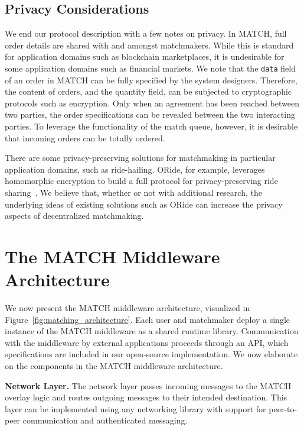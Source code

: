 \subsection{Privacy Considerations}
We end our protocol description with a few notes on privacy.
In MATCH, full order details are shared with and amongst matchmakers.
While this is standard for application domains such as blockchain marketplaces, it is undesirable for some application domains such as financial markets.
We note that the \texttt{data} field of an order in MATCH can be fully specified by the system designers.
Therefore, the content of orders, and the quantity field, can be subjected to cryptographic protocols such as encryption.
Only when an agreement has been reached between two parties, the order specifications can be revealed between the two interacting parties.
To leverage the functionality of the match queue, however, it is desirable that incoming orders can be totally ordered.

There are some privacy-preserving solutions for matchmaking in particular application domains, such as ride-hailing.
ORide, for example, leverages homomorphic encryption to build a full protocol for privacy-preserving ride sharing~\cite{pham2017oride}.
We believe that, whether or not with additional research, the underlying ideas of existing solutions such as ORide can increase the privacy aspects of decentralized matchmaking.

\section{The MATCH Middleware Architecture}
\label{sec:architecture}
We now present the MATCH middleware architecture, visualized in Figure~\ref{fig:matching_architecture}.
Each user and matchmaker deploy a single instance of the MATCH middleware as a shared runtime library.
Communication with the middleware by external applications proceeds through an API, which specifications are included in our open-source implementation.
We now elaborate on the components in the MATCH middleware architecture.

\textbf{Network Layer.}
The network layer passes incoming messages to the MATCH overlay logic and routes outgoing messages to their intended destination.
This layer can be implemented using any networking library with support for peer-to-peer communication and authenticated messaging.

